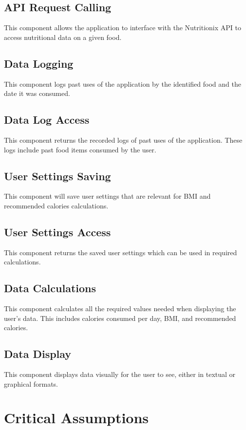 \documentclass{article}
\begin{document}
\subsection{API Request Calling}
This component allows the application to interface with the Nutritionix API to access nutritional data on a given food.  

\subsection{Data Logging}
This component logs past uses of the application by the identified food and the date it was consumed.   

\subsection{Data Log Access}
This component returns the recorded logs of past uses of the application. These logs include past food items consumed by the user.

\subsection{User Settings Saving}
This component will save user settings that are relevant for BMI and recommended calories calculations.

\subsection{User Settings Access}
This component returns the saved user settings which can be used in required calculations.

\subsection{Data Calculations}
This component calculates all the required values needed when displaying the user's data. This includes calories consumed per day, BMI, and recommended calories. 

\subsection{Data Display}
This component displays data visually for the user to see, either in textual or graphical formats.

\section{Critical Assumptions}
\end{document}
